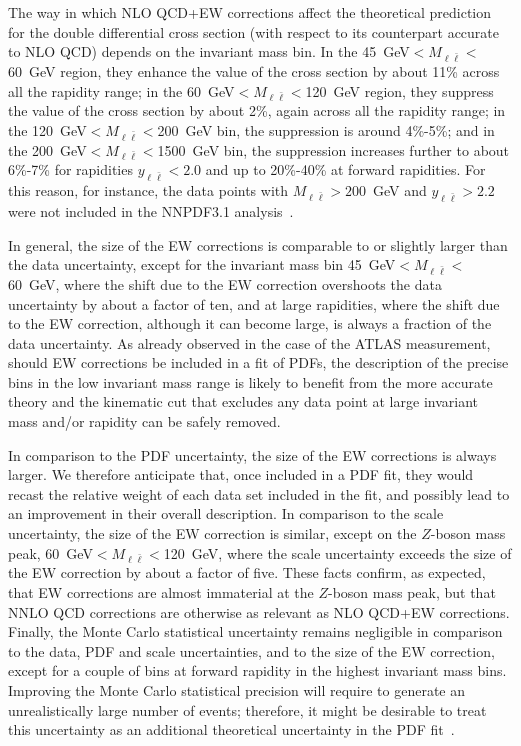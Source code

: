 The way in which NLO QCD+EW corrections affect the theoretical prediction for
the double differential cross section (with respect to its counterpart accurate
to NLO QCD) depends on the invariant mass bin. In the
45~GeV$<M_{\ell\bar\ell}<$60~GeV region, they enhance the value of the cross
section by about 11\% across all the rapidity range; in the
60~GeV$<M_{\ell\bar\ell}<$120~GeV region, they suppress the value of the cross
section by about 2\%, again across all the rapidity range; in the 
120~GeV$<M_{\ell\bar\ell}<$200~GeV bin, the suppression is around 4\%-5\%; and in
the 200~GeV$<M_{\ell\bar\ell}<$1500~GeV bin, the suppression increases further to
about 6\%-7\% for rapidities $y_{\ell\bar\ell}<2.0$ and up to 20\%-40\% at forward
rapidities. For this reason, for instance, the data points with
$M_{\ell\bar\ell}>200$~GeV and $y_{\ell\bar\ell}>2.2$ were not included in the
NNPDF3.1 analysis~\cite{Ball:2017nwa}.

In general, the size of the EW corrections is comparable to or slightly larger
than the data uncertainty, except for the invariant mass bin 
45~GeV$<M_{\ell\bar\ell}<$60~GeV, where the shift due to the EW correction
overshoots the data uncertainty by about a factor of ten, and at large
rapidities, where the shift due to the EW correction, although it can become
large, is always a fraction of the data uncertainty. As already observed in the
case of the ATLAS measurement, should EW corrections be included in a fit of
PDFs, the description of the precise bins in the low invariant mass range is
likely to benefit from the more accurate theory and the kinematic cut that
excludes any data point at large invariant mass and/or rapidity can be safely
removed.

In comparison to the PDF uncertainty, the size of the EW corrections is always
larger. We therefore anticipate that, once included in a PDF fit, they would
recast the relative weight of each data set included in the fit, and possibly
lead to an improvement in their overall description. In comparison to the scale
uncertainty, the size of the EW correction is similar, except on the $Z$-boson
mass peak, 60~GeV$<M_{\ell\bar\ell}<$120~GeV, where the scale uncertainty exceeds
the size of the EW correction by about a factor of five. These facts confirm,
as expected, that EW corrections are almost immaterial at the $Z$-boson mass
peak, but that NNLO QCD corrections are otherwise as relevant as NLO QCD+EW
corrections. Finally, the Monte Carlo statistical uncertainty remains negligible
in comparison to the data, PDF and scale uncertainties, and to the size of the
EW correction, except for a couple of bins at forward rapidity in the highest
invariant mass bins. Improving the Monte Carlo statistical precision will
require to generate an unrealistically large number of events; therefore, it
might be desirable to treat this uncertainty as an additional theoretical
uncertainty in the PDF fit~\cite{Ball:2018lag}.

